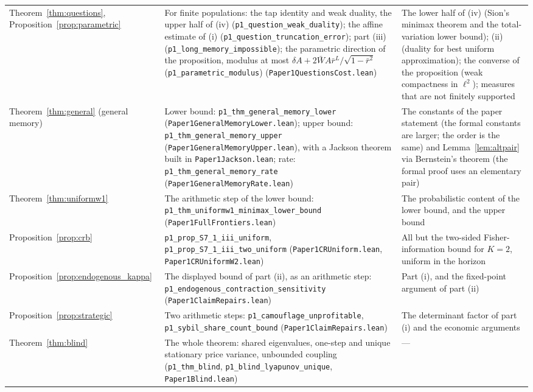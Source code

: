\documentclass[12pt]{article}
\theoremstyle{definition}
\theoremstyle{remark}
\begin{document}
\begin{longtable}{>{\raggedright\arraybackslash}p{}>{\raggedright\arraybackslash}p{}>{\raggedright\arraybackslash}p{}}
Theorem~\ref{thm:questions}, Proposition~\ref{prop:parametric} & For finite populations: the tap identity and weak duality, the upper half of (iv) (\texttt{p1\_question\_weak\_duality}); the affine estimate of (i) (\texttt{p1\_question\_truncation\_error}); part (iii) (\texttt{p1\_long\_memory\_impossible}); the parametric direction of the proposition, modulus at most $\delta A+2\bar WA\bar r^L/\sqrt{1-\bar r^2}$ (\texttt{p1\_parametric\_modulus}) (\nolinkurl{Paper1QuestionsCost.lean}) & The lower half of (iv) (Sion's minimax theorem and the total-variation lower bound); (ii) (duality for best uniform approximation); the converse of the proposition (weak compactness in $\ell^2$); measures that are not finitely supported\\
Theorem~\ref{thm:general} (general memory) & Lower bound: \texttt{p1\_thm\_general\_memory\_lower} (\nolinkurl{Paper1GeneralMemoryLower.lean}); upper bound: \texttt{p1\_thm\_general\_memory\_upper} (\nolinkurl{Paper1GeneralMemoryUpper.lean}), with a Jackson theorem built in \nolinkurl{Paper1Jackson.lean}; rate: \texttt{p1\_thm\_general\_memory\_rate} (\nolinkurl{Paper1GeneralMemoryRate.lean}) & The constants of the paper statement (the formal constants are larger; the order is the same) and Lemma~\ref{lem:altpair} via Bernstein's theorem (the formal proof uses an elementary pair)\\
Theorem~\ref{thm:uniformw1} & The arithmetic step of the lower bound: \texttt{p1\_thm\_uniformw1\_minimax\_lower\_bound} (\nolinkurl{Paper1FullFrontiers.lean}) & The probabilistic content of the lower bound, and the upper bound\\
Proposition~\ref{prop:crb} & \nolinkurl{p1_prop_S7_1_iii_uniform}, \nolinkurl{p1_prop_S7_1_iii_two_uniform} (\nolinkurl{Paper1CRUniform.lean}, \nolinkurl{Paper1CRUniformW2.lean}) & All but the two-sided Fisher-information bound for $K=2$, uniform in the horizon\\
Proposition~\ref{prop:endogenous_kappa} & The displayed bound of part (ii), as an arithmetic step: \nolinkurl{p1_endogenous_contraction_sensitivity} (\nolinkurl{Paper1ClaimRepairs.lean}) & Part (i), and the fixed-point argument of part (ii)\\
Proposition~\ref{prop:strategic} & Two arithmetic steps: \nolinkurl{p1_camouflage_unprofitable}, \nolinkurl{p1_sybil_share_count_bound} (\nolinkurl{Paper1ClaimRepairs.lean}) & The determinant factor of part (i) and the economic arguments\\
Theorem~\ref{thm:blind} & The whole theorem: shared eigenvalues, one-step and unique stationary price variance, unbounded coupling (\texttt{p1\_thm\_blind}, \texttt{p1\_blind\_lyapunov\_unique}, \nolinkurl{Paper1Blind.lean}) & ---\\

\end{longtable}
\end{document}
